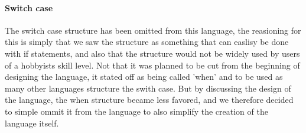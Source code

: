 

\paragraph*{Switch case}
The switch case structure has been omitted from this language, the reasioning for this is simply that we saw the structure as something that can easlisy be done with if statements, and also that the structure would not be widely used by users of a hobbyists skill level. Not that it was planned to be cut from the beginning of designing the language, it stated off as being called 'when' and to be used as many other languages structure the swith case. But by discussing the design of the language, the when structure became less favored, and we therefore decided to simple ommit it from the language to also simplify the creation of the language itself. 
